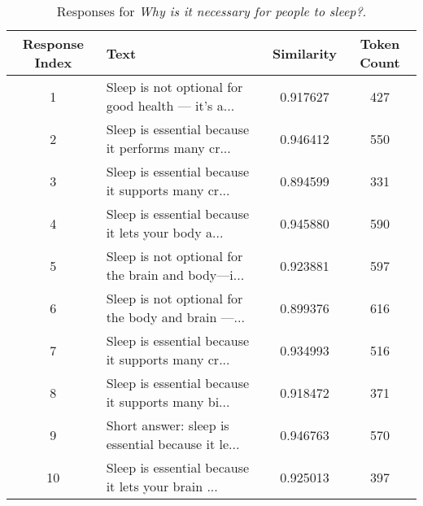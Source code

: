 \documentclass{article}
\begin{document}
\begin{table}[ht]
    \centering
    \caption{Responses for \textit{Why is it necessary for people to sleep?}.}
    \label{tab:sleep_variants}
    \begin{tabular}{c >{\raggedright\arraybackslash}p{8cm} S[table-format=1.6] c}
        \toprule
        Response Index & Text & Similarity & Token Count\\
         & Sleep is not optional for good health — it’s a... & 0.917627 & 427\\
        2 & Sleep is essential because it performs many cr... & 0.946412 & 550\\
        3 & Sleep is essential because it supports many cr... & 0.894599 & 331\\
        4 & Sleep is essential because it lets your body a... & 0.945880 & 590\\
        5 & Sleep is not optional for the brain and body—i... & 0.923881 & 597\\
        6 & Sleep is not optional for the body and brain —... & 0.899376 & 616\\
        7 & Sleep is essential because it supports many cr... & 0.934993 & 516\\
        8 & Sleep is essential because it supports many bi... & 0.918472 & 371\\
        9 & Short answer: sleep is essential because it le... & 0.946763 & 570\\
        10 & Sleep is essential because it lets your brain ... & 0.925013 & 397\\
        \bottomrule
    \end{tabular}
\end{table}
\end{document}
